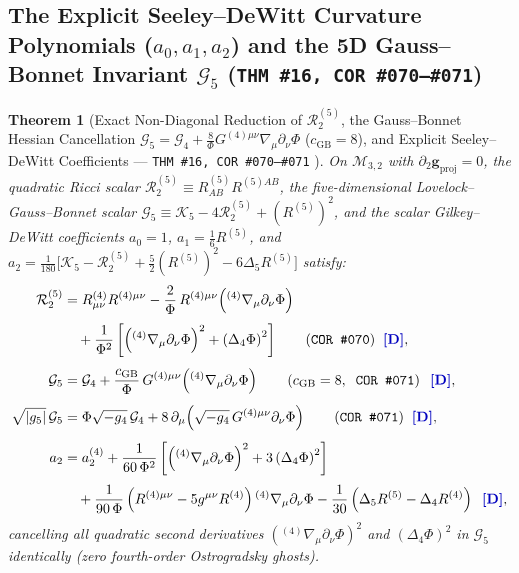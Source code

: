 \documentclass[11pt,a4paper]{article}
\newcommand{\catD}{\text{\textbf{\textcolor{blue!75!black}{[D]}}}}
\theoremstyle{definition}
\theoremstyle{plain}
\newtheorem{theorem}[axiom]{Theorem}
\theoremstyle{remark}
\begin{document}
\subsection{\texorpdfstring{The Explicit Seeley--DeWitt Curvature Polynomials ($a_0, a_1, a_2$) and the 5D Gauss--Bonnet Invariant $\mathcal{G}_5$ (\texttt{THM~\#16, COR~\#070--\#071})}{The Explicit Seeley-DeWitt Curvature Polynomials and the 5D Gauss-Bonnet Invariant G\_5}}

\begin{theorem}[Exact Non-Diagonal Reduction of $\mathcal{R}_2^{(5)}$, the Gauss--Bonnet Hessian Cancellation $\mathcal{G}_5 = \mathcal{G}_4 + \frac{8}{\Phi}G^{(4)\mu\nu}\nabla_\mu\partial_\nu\Phi$ ($c_{\mathrm{GB}}=8$), and Explicit Seeley--DeWitt Coefficients --- \texttt{THM~\#16, COR~\#070--\#071} \catD]\label{thm:c4_gb_seeley_dewitt_identities}\label{thm:c4_gauss_bonnet_cancellation}
On $\mathcal{M}_{3,2}$ with $\partial_2\mathbf{g}_{\mathrm{proj}} = 0$, the quadratic Ricci scalar $\mathcal{R}_2^{(5)} \equiv R_{AB}^{(5)}R^{(5)AB}$, the five-dimensional Lovelock--Gauss--Bonnet scalar $\mathcal{G}_5 \equiv \mathcal{K}_5 - 4\mathcal{R}_2^{(5)} + (R^{(5)})^2$, and the scalar Gilkey--DeWitt coefficients $a_0 = 1$, $a_1 = \frac{1}{6}R^{(5)}$, and $a_2 = \frac{1}{180}\big[\mathcal{K}_5 - \mathcal{R}_2^{(5)} + \frac{5}{2}(R^{(5)})^2 - 6\Delta_5 R^{(5)}\big]$ satisfy:
\begin{align}
\mathcal{R}_2^{(5)} &= R_{\mu\nu}^{(4)}R^{(4)\mu\nu} - \frac{2}{\Phi}\,R^{(4)\mu\nu}\!\left({}^{(4)}\nabla_\mu\partial_\nu\Phi\right) \nonumber \\[3pt]
&\quad + \frac{1}{\Phi^2}\left[\left({}^{(4)}\nabla_\mu\partial_\nu\Phi\right)^2 + \left(\Delta_4\Phi\right)^2\right] \qquad \textnormal{(\texttt{COR~\#070})} \;\;\catD, \label{eq:c4_r2_split} \\[4pt]
\mathcal{G}_5 &= \mathcal{G}_4 + \frac{c_{\mathrm{GB}}}{\Phi}\,G^{(4)\mu\nu}\!\left({}^{(4)}\nabla_\mu\partial_\nu\Phi\right) \qquad \left(c_{\mathrm{GB}} = 8, \;\; \textnormal{\texttt{COR~\#071}}\right) \;\;\catD, \label{eq:c4_gb_split} \\[4pt]
\sqrt{|g_5|}\,\mathcal{G}_5 &= \Phi\sqrt{-g_4}\,\mathcal{G}_4 + 8\,\partial_\mu\!\left(\sqrt{-g_4}\,G^{(4)\mu\nu}\partial_\nu\Phi\right) \qquad \textnormal{(\texttt{COR~\#071})} \;\;\catD, \label{eq:c4_gb_volume_divergence} \\[4pt]
a_2 &= a_2^{(4)} + \frac{1}{60\,\Phi^2}\left[\left({}^{(4)}\nabla_\mu\partial_\nu\Phi\right)^2 + 3\left(\Delta_4\Phi\right)^2\right] \nonumber \\[3pt]
&\quad + \frac{1}{90\,\Phi}\left(R^{(4)\mu\nu} - 5g^{\mu\nu}R^{(4)}\right){}^{(4)}\nabla_\mu\partial_\nu\Phi - \frac{1}{30}\left(\Delta_5 R^{(5)} - \Delta_4 R^{(4)}\right) \;\;\catD, \label{eq:c4_a1_a2_explicit}
\end{align}
cancelling all quadratic second derivatives $({}^{(4)}\nabla_\mu\partial_\nu\Phi)^2$ and $(\Delta_4\Phi)^2$ in $\mathcal{G}_5$ identically (zero fourth-order Ostrogradsky ghosts).
\end{theorem}
\end{document}
